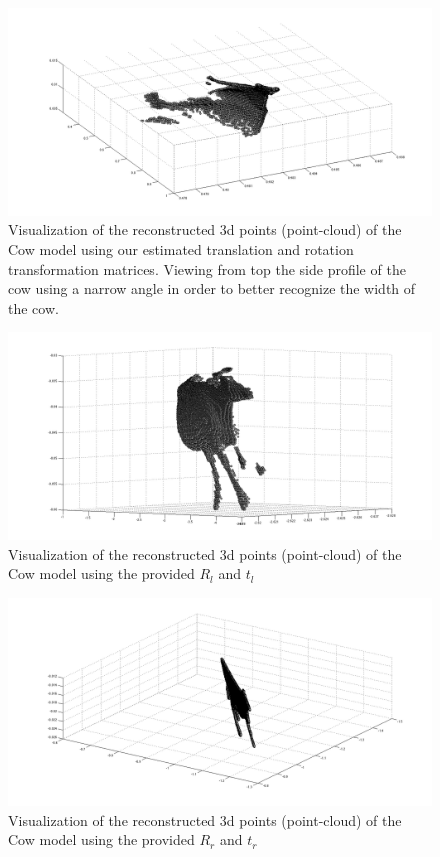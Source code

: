 \documentclass{paper}
\begin{document}
\begin{figure}[H]
\centering
\includegraphics[width=\textwidth]{figures/rec_esti_4}
\caption{Visualization of the reconstructed 3d points (point-cloud) of the Cow model using our estimated translation and rotation transformation matrices. Viewing from top the side profile of the cow using a narrow angle in order to better recognize the width of the cow.}
\label{fig:cow_rec_us_4}
\end{figure}

\begin{figure}[H]
\centering
\includegraphics[width=\textwidth]{figures/rec_left_1}
\caption{Visualization of the reconstructed 3d points (point-cloud) of the Cow model using the provided $R_l$ and $t_l$}
\label{fig:cow_rec_rltl}
\end{figure}

\begin{figure}[H]
\centering
\includegraphics[width=\textwidth]{figures/rec_right_1}
\caption{Visualization of the reconstructed 3d points (point-cloud) of the Cow model using the provided $R_r$ and $t_r$}
\label{fig:cow_rec_rrtr}
\end{figure}
\end{document}
